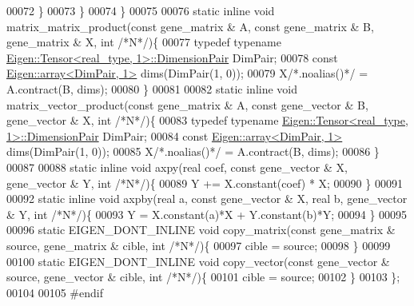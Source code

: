 \begin{DoxyCode}
00072       \}
00073     \}
00074   \}
00075 
00076   \textcolor{keyword}{static} \textcolor{keyword}{inline} \textcolor{keywordtype}{void} matrix\_matrix\_product(\textcolor{keyword}{const} gene\_matrix & A, \textcolor{keyword}{const} gene\_matrix & B, gene\_matrix & X, \textcolor{keywordtype}{
      int}  \textcolor{comment}{/*N*/})\{
00077     \textcolor{keyword}{typedef} \textcolor{keyword}{typename} \hyperlink{class_eigen_1_1_tensor}{Eigen::Tensor<real\_type, 1>::DimensionPair} 
      DimPair;
00078     \textcolor{keyword}{const} \hyperlink{class_eigen_1_1array}{Eigen::array<DimPair, 1>} dims(DimPair(1, 0));
00079     X\textcolor{comment}{/*.noalias()*/} = A.contract(B, dims);
00080   \}
00081 
00082   \textcolor{keyword}{static} \textcolor{keyword}{inline} \textcolor{keywordtype}{void} matrix\_vector\_product(\textcolor{keyword}{const} gene\_matrix & A, \textcolor{keyword}{const} gene\_vector & B, gene\_vector & X, \textcolor{keywordtype}{
      int}  \textcolor{comment}{/*N*/})\{
00083     \textcolor{keyword}{typedef} \textcolor{keyword}{typename} \hyperlink{class_eigen_1_1_tensor}{Eigen::Tensor<real\_type, 1>::DimensionPair} 
      DimPair;
00084     \textcolor{keyword}{const} \hyperlink{class_eigen_1_1array}{Eigen::array<DimPair, 1>} dims(DimPair(1, 0));
00085     X\textcolor{comment}{/*.noalias()*/} = A.contract(B, dims);
00086   \}
00087 
00088   \textcolor{keyword}{static} \textcolor{keyword}{inline} \textcolor{keywordtype}{void} axpy(real coef, \textcolor{keyword}{const} gene\_vector & X, gene\_vector & Y, \textcolor{keywordtype}{int}  \textcolor{comment}{/*N*/})\{
00089     Y += X.constant(coef) * X;
00090   \}
00091 
00092   \textcolor{keyword}{static} \textcolor{keyword}{inline} \textcolor{keywordtype}{void} axpby(real a, \textcolor{keyword}{const} gene\_vector & X, real b, gene\_vector & Y, \textcolor{keywordtype}{int}  \textcolor{comment}{/*N*/})\{
00093     Y = X.constant(a)*X + Y.constant(b)*Y;
00094   \}
00095 
00096   \textcolor{keyword}{static} EIGEN\_DONT\_INLINE \textcolor{keywordtype}{void} copy\_matrix(\textcolor{keyword}{const} gene\_matrix & source, gene\_matrix & cible, \textcolor{keywordtype}{int}  \textcolor{comment}{/*N*/})\{
00097     cible = source;
00098   \}
00099 
00100   \textcolor{keyword}{static} EIGEN\_DONT\_INLINE \textcolor{keywordtype}{void} copy\_vector(\textcolor{keyword}{const} gene\_vector & source, gene\_vector & cible, \textcolor{keywordtype}{int}  \textcolor{comment}{/*N*/})\{
00101     cible = source;
00102   \}
00103 \};
00104 
00105 \textcolor{preprocessor}{#endif}
\end{DoxyCode}
